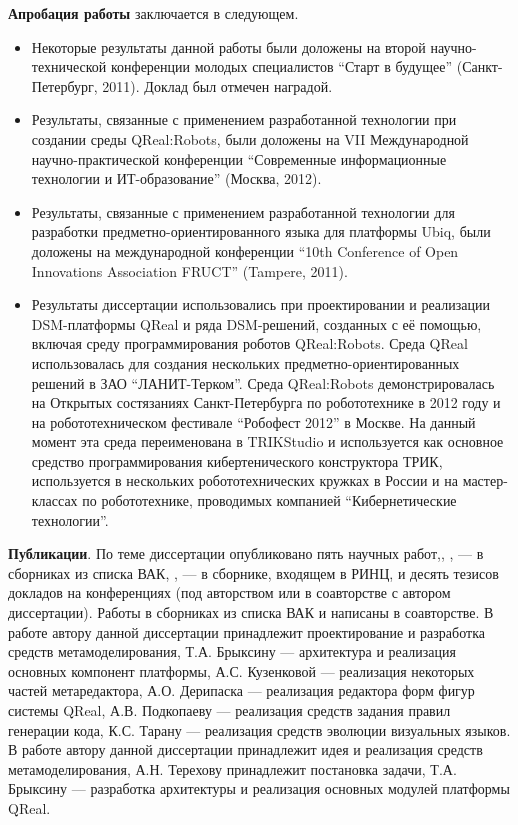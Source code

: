 \textbf{Апробация работы} заключается в следующем.
\begin{itemize}
	\item Некоторые результаты данной работы были доложены на второй 
		научно-технической конференции молодых специалистов "`Старт в будущее"' 
		(Санкт-Петербург, 2011). Доклад был отмечен наградой.
	\item Результаты, связанные с применением разработанной технологии при 
		создании среды QReal:Robots, были доложены на VII Международной 
		научно-практической конференции "`Современные информационные технологии 
		и ИТ-образование"' (Москва, 2012).
	\item Результаты, связанные с применением разработанной технологии для 
		разработки предметно-ориентированного языка для платформы Ubiq, были доложены 
		на международной конференции "`10th Conference of Open Innovations 
		Association FRUCT"' (Tampere, 2011).
	\item Результаты диссертации использовались при проектировании и реализации 
		DSM-платформы QReal и ряда DSM-решений, созданных с её помощью, включая 
		среду программирования роботов QReal:Robots. Среда QReal использовалась для 
		создания нескольких предметно-ориентированных решений в ЗАО “ЛАНИТ-Терком”. 
		Среда QReal:Robots демонстрировалась на Открытых состязаниях 
		Санкт-Петербурга по робототехнике в 2012 году и на робототехническом 
		фестивале "`Робофест 2012"' в Москве. На данный момент эта среда переименована в 
		TRIKStudio и используется как основное средство программирования 
		кибертенического конструктора ТРИК, используется в нескольких робототехнических 
		кружках в России и на мастер-классах по робототехнике, проводимых компанией "`Кибернетические технологии"'.
\end{itemize}

\textbf{Публикации}. По теме диссертации опубликовано пять научных работ,\cite{kuzenkova2011qreal}, 
\cite{litvinov2013robots}, \cite{terekhov2013qreal} --- в сборниках из списка ВАК, 
\cite{terekhov2009architecture}, \cite{osechkina2010gestures} --- в сборнике, входящем в РИНЦ, и 
десять тезисов докладов на конференциях (под авторством или в соавторстве с автором 
диссертации). Работы в сборниках из списка ВАК \cite{kuzenkova2011qreal} и \cite{terekhov2013qreal}
написаны в соавторстве. В работе \cite{kuzenkova2011qreal} автору данной диссертации 
принадлежит проектирование и разработка средств метамоделирования, Т.А. Брыксину --- архитектура и реализация основных
компонент платформы, А.С. Кузенковой --- реализация некоторых частей метаредактора, А.О. Дерипаска
--- реализация редактора форм фигур системы QReal, А.В. Подкопаеву --- реализация средств задания правил генерации кода,
К.С. Тарану --- реализация средств эволюции визуальных языков. В работе \cite{terekhov2013qreal}
автору данной диссертации принадлежит идея и реализация средств метамоделирования, А.Н. Терехову 
принадлежит постановка задачи, Т.А. Брыксину --- разработка архитектуры и реализация основных модулей платформы QReal.

